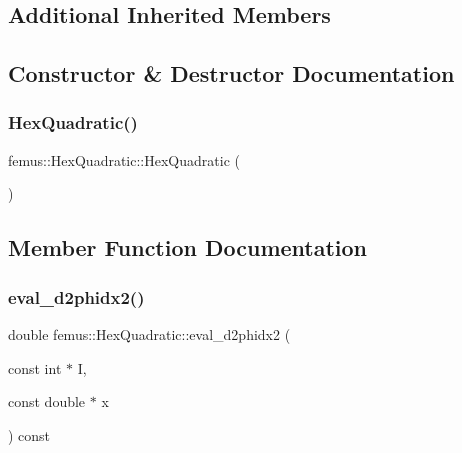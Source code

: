 \subsection*{Additional Inherited Members}


\subsection{Constructor \& Destructor Documentation}
\mbox{\label{classfemus_1_1_hex_quadratic_a7eaa4a672f74d2cd96d488cdc548e843}} 
\subsubsection{\texorpdfstring{Hex\+Quadratic()}{HexQuadratic()}}
{\footnotesize\ttfamily femus\+::\+Hex\+Quadratic\+::\+Hex\+Quadratic (\begin{DoxyParamCaption}{ }\end{DoxyParamCaption})\hspace{0.3cm}{\ttfamily [inline]}}



\subsection{Member Function Documentation}
\mbox{\label{classfemus_1_1_hex_quadratic_a7a68a91e8865121d14f62b88f8756696}} 
\subsubsection{\texorpdfstring{eval\+\_\+d2phidx2()}{eval\_d2phidx2()}}
{\footnotesize\ttfamily double femus\+::\+Hex\+Quadratic\+::eval\+\_\+d2phidx2 (\begin{DoxyParamCaption}\item[{const int $\ast$}]{I,  }\item[{const double $\ast$}]{x }\end{DoxyParamCaption}) const\hspace{0.3cm}{\ttfamily [virtual]}}



